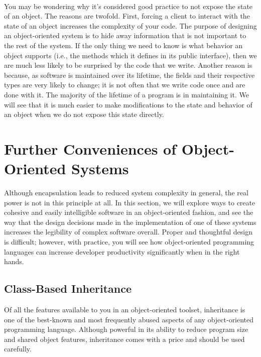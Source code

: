 \documentclass{article}
\begin{document}
\paragraph{}
You may be wondering why it’s considered good practice to not expose the state
of an object. The reasons are twofold. First, forcing a client to interact with
the state of an object increases the complexity of your code. The purpose of
designing an object-oriented system is to hide away information that is not
important to the rest of the system. If the only thing we need to know is what
behavior an object supports (i.e., the methods which it defines in its public
interface), then we are much less likely to be surprised by the code that we
write. Another reason is because, as software is maintained over its lifetime,
the fields and their respective types are very likely to change; it is not often 
that we write code once and are done with it. The majority of the lifetime of a
program is in maintaining it. We will see that it is much easier to make
modifications to the state and behavior of an object when we do not expose this
state directly.

\section{Further Conveniences of Object-Oriented Systems}
Although encapsulation leads to reduced system complexity in general, the real
power is not in this principle at all. In this section, we will explore ways to
create cohesive and easily intelligible software in an object-oriented fashion,
and see the way that the design decisions made in the implementation of one of
these systems increases the legibility of complex software overall. Proper and
thoughtful design is difficult; however, with practice, you will see how
object-oriented programming languages can increase developer productivity
significantly when in the right hands.
\subsection{Class-Based Inheritance}
Of all the features available to you in an object-oriented toolset, inheritance
is one of the best-known and most frequently abused aspects of any
object-oriented programming language. Although powerful in its ability to reduce
program size and shared object features, inheritance comes with a price and
should be used carefully.
\end{document}
